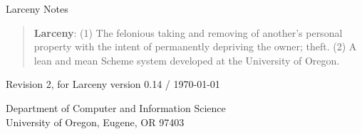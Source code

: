 \pagestyle{empty}


\vspace{.5in}
\centerline{\Huge Larceny Notes}
\vspace{0.75in}

\begin{quote}
{\bf Larceny}: (1) The felonious taking and removing of another's 
personal property with the intent of permanently depriving the owner; theft.
(2) A lean and mean Scheme system developed at the University of Oregon.
\end{quote}

\vspace{1in}
\centerline{Revision 2, for Larceny version 0.14 / \today}
\vspace{3in}
\begin{center}
Department of Computer and Information Science \\
University of Oregon, Eugene, OR 97403
\end{center}

